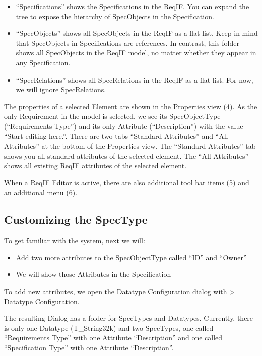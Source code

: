 \begin{itemize}

\item
  ``Specifications'' shows the Specifications in the ReqIF. You can
  expand the tree to expose the hierarchy of SpecObjects in the
  Specification.
\item
  ``SpecObjects'' shows all SpecObjects in the ReqIF as a flat list.
  Keep in mind that SpecObjects in Specifications are references. In
  contrast, this folder shows all SpecObjects in the ReqIF model, no
  matter whether they appear in any Specification.
\item
  ``SpecRelations'' shows all SpecRelations in the ReqIF as a flat list.
  For now, we will ignore SpecRelations.
\end{itemize}

The properties of a selected Element are shown in the Properties view
(4). As the only Requirement in the model is selected, we see its
SpecObjectType (``Requirements Type'') and its only Attribute
(``Description'') with the value ``Start editing here.''. There are two
tabs ``Standard Attributes'' and ``All Attributes'' at the bottom of the
Properties view. The ``Standard Attributes'' tab shows you all standard
attributes of the selected element. The ``All Attributes'' shows all
existing ReqIF attributes of the selected element.

When a ReqIF Editor is active, there are also additional tool bar items
(5) and an additional menu (6).

\subsection{Customizing the SpecType}

To get familiar with the system, next we will:

\begin{itemize}

\item
  Add two more attributes to the SpecObjectType called ``ID'' and
  ``Owner''
\item
  We will show those Attributes in the Specification
\end{itemize}

To add new attributes, we open the Datatype Configuration dialog with
\pror{} \textgreater{} Datatype Configuration.

The resulting Dialog has a folder for SpecTypes and Datatypes.
Currently, there is only one Datatype (T\_String32k) and two SpecTypes,
one called ``Requirements Type'' with one Attribute ``Description'' and
one called ``Specification Type'' with one Attribute ``Description''.

